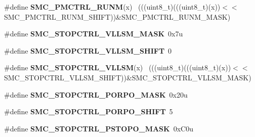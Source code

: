 \begin{DoxyCompactItemize}
\item 
\hypertarget{group___s_m_c___register___masks_gaecab837484639ef513d4c54d68eacc34}{}\#define {\bfseries S\+M\+C\+\_\+\+P\+M\+C\+T\+R\+L\+\_\+\+R\+U\+N\+M}(x)                                          ~(((uint8\+\_\+t)(((uint8\+\_\+t)(x))$<$$<$S\+M\+C\+\_\+\+P\+M\+C\+T\+R\+L\+\_\+\+R\+U\+N\+M\+\_\+\+S\+H\+I\+F\+T))\&S\+M\+C\+\_\+\+P\+M\+C\+T\+R\+L\+\_\+\+R\+U\+N\+M\+\_\+\+M\+A\+S\+K)\label{group___s_m_c___register___masks_gaecab837484639ef513d4c54d68eacc34}

\item 
\hypertarget{group___s_m_c___register___masks_ga3136f47b42d64148e5d163e5df6fc661}{}\#define {\bfseries S\+M\+C\+\_\+\+S\+T\+O\+P\+C\+T\+R\+L\+\_\+\+V\+L\+L\+S\+M\+\_\+\+M\+A\+S\+K}~0x7u\label{group___s_m_c___register___masks_ga3136f47b42d64148e5d163e5df6fc661}

\item 
\hypertarget{group___s_m_c___register___masks_gadcd933de05a733bb58e1bfdeba6c653b}{}\#define {\bfseries S\+M\+C\+\_\+\+S\+T\+O\+P\+C\+T\+R\+L\+\_\+\+V\+L\+L\+S\+M\+\_\+\+S\+H\+I\+F\+T}~0\label{group___s_m_c___register___masks_gadcd933de05a733bb58e1bfdeba6c653b}

\item 
\hypertarget{group___s_m_c___register___masks_ga845ecbb427c9d51c2718cf87eb63e6ac}{}\#define {\bfseries S\+M\+C\+\_\+\+S\+T\+O\+P\+C\+T\+R\+L\+\_\+\+V\+L\+L\+S\+M}(x)                                    ~(((uint8\+\_\+t)(((uint8\+\_\+t)(x))$<$$<$S\+M\+C\+\_\+\+S\+T\+O\+P\+C\+T\+R\+L\+\_\+\+V\+L\+L\+S\+M\+\_\+\+S\+H\+I\+F\+T))\&S\+M\+C\+\_\+\+S\+T\+O\+P\+C\+T\+R\+L\+\_\+\+V\+L\+L\+S\+M\+\_\+\+M\+A\+S\+K)\label{group___s_m_c___register___masks_ga845ecbb427c9d51c2718cf87eb63e6ac}

\item 
\hypertarget{group___s_m_c___register___masks_ga686e24e6e009e5066a1325f159c603bd}{}\#define {\bfseries S\+M\+C\+\_\+\+S\+T\+O\+P\+C\+T\+R\+L\+\_\+\+P\+O\+R\+P\+O\+\_\+\+M\+A\+S\+K}~0x20u\label{group___s_m_c___register___masks_ga686e24e6e009e5066a1325f159c603bd}

\item 
\hypertarget{group___s_m_c___register___masks_ga36eb36236efe97e99984cfc2e6f215be}{}\#define {\bfseries S\+M\+C\+\_\+\+S\+T\+O\+P\+C\+T\+R\+L\+\_\+\+P\+O\+R\+P\+O\+\_\+\+S\+H\+I\+F\+T}~5\label{group___s_m_c___register___masks_ga36eb36236efe97e99984cfc2e6f215be}

\item 
\hypertarget{group___s_m_c___register___masks_ga8495d4f93210f68516438215c68c9b80}{}\#define {\bfseries S\+M\+C\+\_\+\+S\+T\+O\+P\+C\+T\+R\+L\+\_\+\+P\+S\+T\+O\+P\+O\+\_\+\+M\+A\+S\+K}~0x\+C0u\label{group___s_m_c___register___masks_ga8495d4f93210f68516438215c68c9b80}


\end{DoxyCompactItemize}
